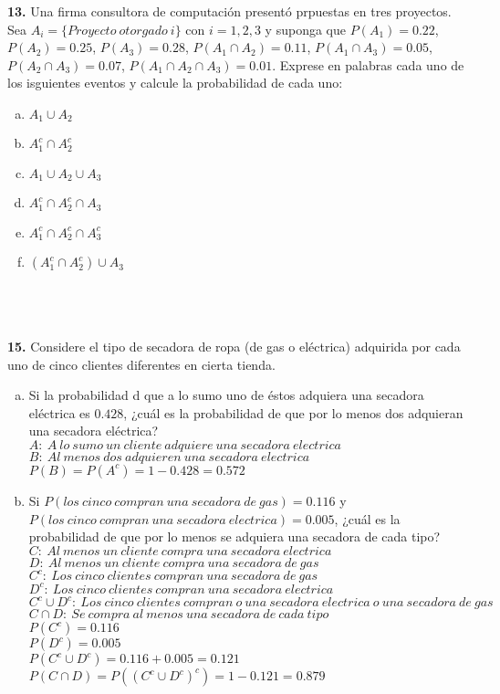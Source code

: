\documentclass[12pt, letterpaper, spanish]{article}
\begin{document}
\textbf{13.} Una firma consultora de computación presentó prpuestas en tres proyectos. Sea $A_i = \{Proyecto\ otorgado\ i \}$ con $i=1,2,3$ y suponga que $P(A_1)=0.22$, $P(A_2)=0.25$, $P(A_3)=0.28$, $P(A_1\cap A_2)=0.11$, $P(A_1\cap A_3)=0.05$, $P(A_2\cap A_3)=0.07$, $P(A_1\cap A_2\cap A_3)=0.01$. Exprese en palabras cada uno de los isguientes eventos y calcule la probabilidad de cada uno:
\begin{enumerate}[a)]
    \item $A_1\cup A_2$
    \item $A_1^c\cap A_2^c$
    \item $A_1\cup A_2\cup A_3$
    \item $A_1^c\cap A_2^c\cap A_3$
    \item $A_1^c\cap A_2^c\cap A_3^c$
    \item $(A_1^c\cap A_2^c)\cup A_3$
\end{enumerate}\\ \\ \\

\textbf{15.} Considere el tipo de secadora de ropa (de gas o eléctrica) adquirida por cada uno de cinco clientes diferentes en cierta tienda.
\begin{enumerate}[a)]
    \item Si la probabilidad d que a lo sumo uno de éstos adquiera una secadora eléctrica es $0.428$, ¿cuál es la probabilidad de que por lo menos dos adquieran una secadora eléctrica?\\
    $A:\ A\ lo\ sumo\ un\ cliente\ adquiere\ una\ secadora\ electrica$\\
    $B:\ Al\ menos\ dos\ adquieren\ una\ secadora\ electrica$\\
    $P(B)=P(A^c)=1-0.428=0.572$
    \item Si $P(los\ cinco\ compran\ una\ secadora\ de\ gas)=0.116$ y $P(los\ cinco\ compran\ una\ secadora\ electrica) = 0.005$, ¿cuál es la probabilidad de que por lo menos se adquiera una secadora de cada tipo?\\
    $C:\ Al\ menos\ un\ cliente\ compra\ una\ secadora\ electrica$\\
    $D:\ Al\ menos\ un\ cliente\ compra\ una\ secadora\ de\ gas$\\
    $C^c:\ Los\ cinco\ clientes\ compran\ una\ secadora\ de\ gas$\\
    $D^c:\ Los\ cinco\ clientes\ compran\ una\ secadora\ electrica$\\
    $C^c\cup D^c:\ Los\ cinco\ clientes\ compran\ o\ una\ secadora\ electrica\ o\ una\ secadora\ de\ gas$\\
    $C\cap D:\ Se\ compra\ al\ menos\ una\ secadora\ de\ cada\ tipo$\\
    $P(C^c)=0.116$\\
    $P(D^c)=0.005$\\
    $P(C^c\cup D^c)=0.116+0.005=0.121$\\
    $P(C\cap D)=P((C^c\cup D^c)^c)=1-0.121=0.879$
\end{enumerate}\\ \\ \\
\end{document}

